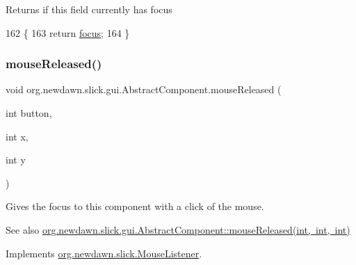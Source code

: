 \begin{DoxyReturn}{Returns}
if this field currently has focus 
\end{DoxyReturn}

\begin{DoxyCode}
162                               \{
163         \textcolor{keywordflow}{return} \mbox{\hyperlink{classorg_1_1newdawn_1_1slick_1_1gui_1_1_abstract_component_a9a7b67f481728081895d167e792aaa74}{focus}};
164     \}
\end{DoxyCode}
\mbox{\label{classorg_1_1newdawn_1_1slick_1_1gui_1_1_abstract_component_a70585519bb21610b43de4743366732f5}} 
\subsubsection{\texorpdfstring{mouse\+Released()}{mouseReleased()}}
{\footnotesize\ttfamily void org.\+newdawn.\+slick.\+gui.\+Abstract\+Component.\+mouse\+Released (\begin{DoxyParamCaption}\item[{int}]{button,  }\item[{int}]{x,  }\item[{int}]{y }\end{DoxyParamCaption})\hspace{0.3cm}{\ttfamily [inline]}}

Gives the focus to this component with a click of the mouse.

\begin{DoxySeeAlso}{See also}
\mbox{\hyperlink{classorg_1_1newdawn_1_1slick_1_1gui_1_1_abstract_component_a70585519bb21610b43de4743366732f5}{org.\+newdawn.\+slick.\+gui.\+Abstract\+Component\+::mouse\+Released(int, int, int)}} 
\end{DoxySeeAlso}


Implements \mbox{\hyperlink{interfaceorg_1_1newdawn_1_1slick_1_1_mouse_listener_a8d1606869f610664f9299565067d5571}{org.\+newdawn.\+slick.\+Mouse\+Listener}}.


